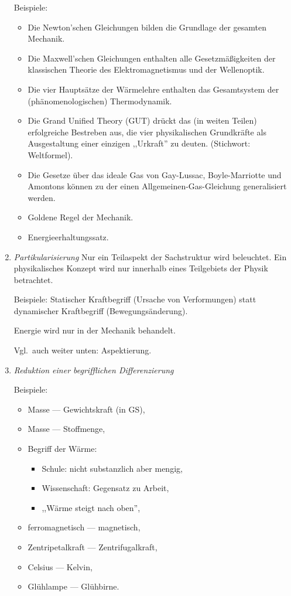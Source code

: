 \begin{enumerate}
\mip
Beispiele:
\begin{itemize}
\item Die Newton'schen Gleichungen bilden die Grundlage der gesamten
Mechanik.
\item Die Maxwell'schen Gleichungen enthalten alle Gesetzm\"{a}{\ss}igkeiten
der klassischen Theorie des Elektromagnetismus und der Wellenoptik.
\item Die vier Haupts\"{a}tze der W\"{a}rmelehre enthalten das
Gesamtsystem der (ph\"{a}nomenologischen) Thermodynamik.
\item
Die Grand Unified Theory (GUT) dr\"{u}ckt das (in weiten Teilen)
erfolgreiche Bestreben aus, die vier physikalischen Grundkr\"{a}fte
als Ausgestaltung einer einzigen ,,Urkraft'' zu deuten.
(Stichwort: Weltformel).
\item
Die Gesetze \"{u}ber das ideale Gas von
Gay-Lussac, Boyle-Marriotte und Amontons k\"{o}nnen zu der einen
Allgemeinen-Gas-Gleichung generalisiert werden.
\item
Goldene Regel der Mechanik.
\item
Energieerhaltungssatz.
\end{itemize}

\item { \it Partikularisierung }
Nur ein Teilaspekt der Sachstruktur wird beleuchtet.
Ein physikalisches Konzept wird nur innerhalb eines Teilgebiets der
Physik betrachtet.

\mip
Beispiele:
Statischer Kraftbegriff (Ursache von Verformungen) statt dynamischer
Kraftbegriff (Bewegungs\"{a}nderung).

\mip
Energie wird nur in der Mechanik behandelt.

Vgl.\ auch weiter unten: Aspektierung.

\item{ \it Reduktion einer begrifflichen Differenzierung }

\mip
Beispiele:
\begin{itemize}
\item Masse --- Gewichtskraft (in GS),
\item Masse --- Stoffmenge,
\item Begriff der W\"{a}rme:
\begin{itemize}
\item Schule: nicht substanzlich aber mengig,
\item Wissenschaft: Gegensatz zu Arbeit,
\item ,,W\"{a}rme steigt nach oben'',
\end{itemize}
\item ferromagnetisch --- magnetisch,
\item Zentripetalkraft --- Zentrifugalkraft,
\item Celsius --- Kelvin,
\item Gl\"{u}hlampe --- Gl\"{u}hbirne.
\end{itemize}


\end{enumerate}
